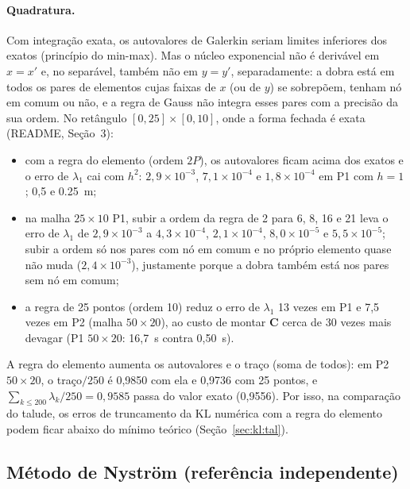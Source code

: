 \paragraph{Quadratura.}
Com integração exata, os autovalores de Galerkin seriam limites inferiores dos exatos (princípio do min-max). Mas o
núcleo exponencial não é derivável em $x = x'$ e, no separável, também não em $y = y'$, separadamente: a dobra está em
todos os pares de elementos cujas faixas de $x$ (ou de $y$) se sobrepõem, tenham nó em comum ou não, e a regra de Gauss
não integra esses pares com a precisão da sua ordem. No retângulo $[0, 25] \times [0, 10]$, onde a forma fechada é
exata (README, Seção~3):
\begin{itemize}
  \item com a regra do elemento (ordem $2P$), os autovalores ficam acima dos exatos e o erro de $\lambda_1$ cai com
    $h^2$: $2{,}9 \times 10^{-3}$, $7{,}1 \times 10^{-4}$ e $1{,}8 \times 10^{-4}$ em P1 com $h = 1$; 0,5 e
    \SI{0.25}{m};
  \item na malha $25 \times 10$ P1, subir a ordem da regra de 2 para 6, 8, 16 e 21 leva o erro de $\lambda_1$ de
    $2{,}9 \times 10^{-3}$ a $4{,}3 \times 10^{-4}$, $2{,}1 \times 10^{-4}$, $8{,}0 \times 10^{-5}$ e
    $5{,}5 \times 10^{-5}$; subir a ordem só nos pares com nó em comum e no próprio elemento quase não muda
    ($2{,}4 \times 10^{-3}$), justamente porque a dobra também está nos pares sem nó em comum;
  \item a regra de 25 pontos (ordem 10) reduz o erro de $\lambda_1$ 13 vezes em P1 e 7,5 vezes em P2 (malha
    $50 \times 20$), ao custo de montar $\mathbf{C}$ cerca de 30 vezes mais devagar (P1 $50 \times 20$: 16,7~s
    contra 0,50~s).
\end{itemize}
A regra do elemento aumenta os autovalores e o traço (soma de todos): em P2 $50 \times 20$, o traço$/250$ é 0,9850 com
ela e 0,9736 com 25 pontos, e $\sum_{k \le 200} \lambda_k / 250 = 0{,}9585$ passa do valor exato (0,9556). Por isso, na
comparação do talude, os erros de truncamento da KL numérica com a regra do elemento podem ficar abaixo do mínimo
teórico (Seção~\ref{sec:kl:tal}).

\subsection{Método de Nyström (referência independente)}\label{kl:form:nystrom}

